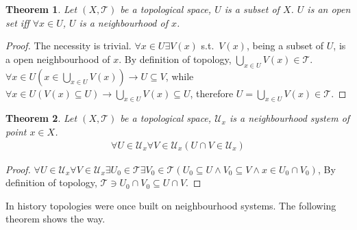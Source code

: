\documentclass{article}%
\theoremstyle{plain}
\newtheorem{theorem}{Theorem}[section] %
\theoremstyle{definition}
\begin{document}
\begin{theorem}\label{open_iff_neighbourhood}
Let $(X,\mathscr T)$ be a topological space, $U$ is a subset of $X$. 
$U$ is an open set \emph{iff} $\forall x\in U$, $U$ is a neighbourhood of $x$.
\end{theorem}
\begin{proof}
The necessity is trivial. $\forall x\in U\exists V(x)$ s.t.\ $V(x)$, being a subset of $U$, is a open neighbourhood of $x$. By definition of topology, $\bigcup\limits_{ x\in U}V(x) \in \mathscr T$. $\forall x\in U( x\in \bigcup\limits_{ x\in U}V(x) ) \to U\subseteq V$, while $\forall x\in U (V( x)\subseteq U)\to \bigcup\limits_{ x\in U}V(x) \subseteq U$, therefore $U=\bigcup\limits_{ x\in U}V(x) \in \mathscr T$.
\end{proof}

\begin{theorem}
Let $(X,\mathscr T)$ be a topological space, $\mathscr U_x$ is a neighbourhood system of point $x\in X$.
\begin{align*}
	\forall U\in \mathscr U_x\forall V\in \mathscr U_x( U\cap V\in \mathscr U_x)
\end{align*}
\end{theorem}
\begin{proof}
$\forall U\in \mathscr U_x\forall V\in \mathscr U_x\exists U_0\in \mathscr T\exists V_0\in \mathscr T(U_0\subseteq U\wedge V_0\subseteq V\wedge x\in U_0\cap V_0 )$, By definition of topology, $\mathscr T\ni U_0\cap V_0\subseteq U\cap V$. 
\end{proof}

In history topologies were once built on neighbourhood systems. The following theorem shows the way.
 
\end{document}
